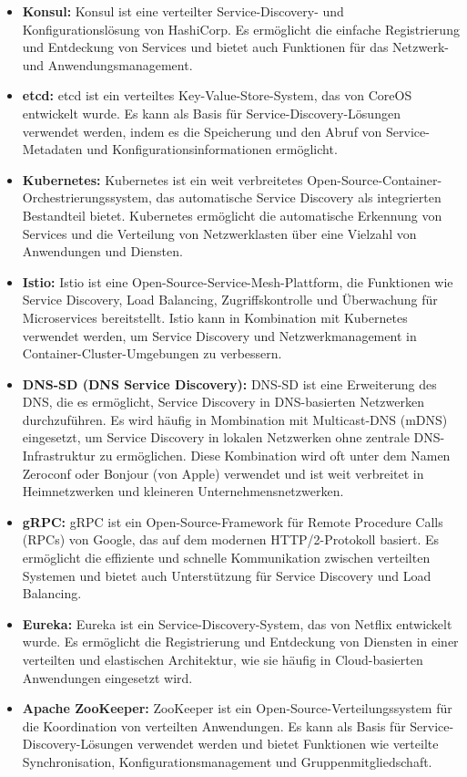 \documentclass[../vs-script-first-v01.tex]{subfiles}
\begin{document}
\begin{itemize}
\item \textbf{Konsul:} Konsul ist eine verteilter Service-Discovery- und Konfigurationslösung von HashiCorp. Es ermöglicht die einfache Registrierung und Entdeckung von Services und bietet auch Funktionen für das Netzwerk- und Anwendungsmanagement.

\item \textbf{etcd:} etcd ist ein verteiltes Key-Value-Store-System, das von CoreOS entwickelt wurde. Es kann als Basis für Service-Discovery-Lösungen verwendet werden, indem es die Speicherung und den Abruf von Service-Metadaten und Konfigurationsinformationen ermöglicht.

\item \textbf{Kubernetes:} Kubernetes ist ein weit verbreitetes Open-Source-Container-Orchestrierungssystem, das automatische Service Discovery als integrierten Bestandteil bietet. Kubernetes ermöglicht die automatische Erkennung von Services und die Verteilung von Netzwerklasten über eine Vielzahl von Anwendungen und Diensten.

\item \textbf{Istio:} Istio ist eine Open-Source-Service-Mesh-Plattform, die Funktionen wie Service Discovery, Load Balancing, Zugriffskontrolle und Überwachung für Microservices bereitstellt. Istio kann in Kombination mit Kubernetes verwendet werden, um Service Discovery und Netzwerkmanagement in Container-Cluster-Umgebungen zu verbessern.

\item \textbf{DNS-SD (DNS Service Discovery):} DNS-SD ist eine Erweiterung des DNS, die es ermöglicht, Service Discovery in DNS-basierten Netzwerken durchzuführen. Es wird häufig in Mombination mit Multicast-DNS (mDNS) eingesetzt, um Service Discovery in lokalen Netzwerken ohne zentrale DNS-Infrastruktur zu ermöglichen. Diese Kombination wird oft unter dem Namen Zeroconf oder Bonjour (von Apple) verwendet und ist weit verbreitet in Heimnetzwerken und kleineren Unternehmensnetzwerken.

\item \textbf{gRPC:} gRPC ist ein Open-Source-Framework für Remote Procedure Calls (RPCs) von Google, das auf dem modernen HTTP/2-Protokoll basiert. Es ermöglicht die effiziente und schnelle Kommunikation zwischen verteilten Systemen und bietet auch Unterstützung für Service Discovery und Load Balancing.

\item \textbf{Eureka:} Eureka ist ein Service-Discovery-System, das von Netflix entwickelt wurde. Es ermöglicht die Registrierung und Entdeckung von Diensten in einer verteilten und elastischen Architektur, wie sie häufig in Cloud-basierten Anwendungen eingesetzt wird.

\item \textbf{Apache ZooKeeper:} ZooKeeper ist ein Open-Source-Verteilungssystem für die Koordination von verteilten Anwendungen. Es kann als Basis für Service-Discovery-Lösungen verwendet werden und bietet Funktionen wie verteilte Synchronisation, Konfigurationsmanagement und Gruppenmitgliedschaft.
\end{itemize}
\end{document}
